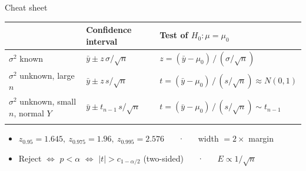 \documentclass[
  11pt,
  ignorenonframetext,
  aspectratio=169,
]{beamer}
\newcounter{none} %
\providecommand{\tightlist}{%
  \setlength{\itemsep}{0pt}\setlength{\parskip}{0pt}}
\begin{document}
\begin{frame}{Cheat sheet}
\protect{}\label{cheat-sheet}
{\def\LTcaptype{none} %
\begin{longtable}[]{@{}
  >{\raggedright\arraybackslash}p{}
  >{\raggedright\arraybackslash}p{}
  >{\raggedright\arraybackslash}p{}@{}}
\toprule\noalign{}
\begin{minipage}[b]{\linewidth}\raggedright
\end{minipage} & \begin{minipage}[b]{\linewidth}\raggedright
\textbf{Confidence interval}
\end{minipage} & \begin{minipage}[b]{\linewidth}\raggedright
\textbf{Test of \(H_0:\mu=\mu_0\)}
\end{minipage} \\
\midrule\noalign{}
\endhead
\(\sigma^2\) known & \(\bar y\pm z\,\sigma/\sqrt n\) &
\(z=(\bar y-\mu_0)\,/\,(\sigma/\sqrt n)\) \\
\(\sigma^2\) unknown, large \(n\) & \(\bar y\pm z\,s/\sqrt n\) &
\(t=(\bar y-\mu_0)\,/\,(s/\sqrt n)\approx N(0,1)\) \\
\(\sigma^2\) unknown, small \(n\), normal \(Y\) &
\(\bar y\pm t_{n-1}\,s/\sqrt n\) &
\(t=(\bar y-\mu_0)\,/\,(s/\sqrt n)\sim t_{n-1}\) \\
\bottomrule\noalign{}
\end{longtable}
}

\begin{itemize}
\tightlist
\item
  \(z_{0.95}=1.645,\ z_{0.975}=1.96,\ z_{0.995}=2.576\) \(\quad\) ·
  \(\quad\) width \(=2\times\) margin
\item
  Reject \(\iff\) \(p<\alpha\) \(\iff\) \(|t|>c_{1-\alpha/2}\)
  (two-sided) \(\quad\) · \(\quad\) \(E\propto1/\sqrt n\)
\end{itemize}
\end{frame}
\end{document}
